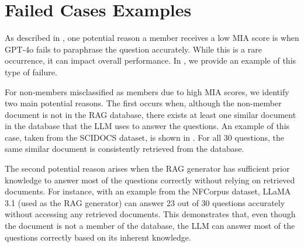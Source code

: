 \section{Failed Cases Examples}
\label{app:failed_examples}

As described in , one potential reason a member receives a low MIA score is when GPT-4o fails to paraphrase the question accurately. While this is a rare occurrence, it can impact overall performance. In , we provide an example of this type of failure.

For non-members misclassified as members due to high MIA scores, we identify two main potential reasons. The first occurs when, although the non-member document is not in the RAG database, there exists at least one similar document in the database that the LLM uses to answer the questions. An example of this case, taken from the SCIDOCS dataset, is shown in . For all 30 questions, the same similar document is consistently retrieved from the database.

The second potential reason arises when the RAG generator has sufficient prior knowledge to answer most of the questions correctly without relying on retrieved documents. For instance, with an example from the NFCorpus dataset, LLaMA 3.1 (used as the RAG generator) can answer 23 out of 30 questions accurately without accessing any retrieved documents. This demonstrates that, even though the document is not a member of the database, the LLM can answer most of the questions correctly based on its inherent knowledge.
